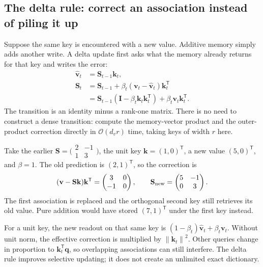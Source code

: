 \documentclass[11pt, oneside]{book}
\newcommand{\norm}[1]{\left\lVert #1 \right\rVert}
\newcommand{\T}{^{\mathsf{T}}}           %
\newcommand{\bigO}[1]{\mathcal{O}\!\left(#1\right)}
\let\originalsubsection\subsection
\renewcommand{\subsection}{\Needspace{6\baselineskip}\originalsubsection}
\begin{document}
\subsection*{The delta rule: correct an association instead of piling it up}
Suppose the same key is encountered with a new value. Additive memory simply adds another write. A delta update first asks what the memory already returns for that key and writes the error:
\begin{align*}
 \widehat{\mathbf{v}}_t&=\mathbf{S}_{t-1}\mathbf{k}_t,\\
 \mathbf{S}_t&=\mathbf{S}_{t-1}
  +\beta_t(\mathbf{v}_t-\widehat{\mathbf{v}}_t)\mathbf{k}_t\T\\
 &=\mathbf{S}_{t-1}(\mathbf{I}-\beta_t\mathbf{k}_t\mathbf{k}_t\T)
  +\beta_t\mathbf{v}_t\mathbf{k}_t\T.
\end{align*}
The transition is an identity minus a rank-one matrix. There is no need to construct a dense transition: compute the memory-vector product and the outer-product correction directly in $\bigO{d_vr}$ time, taking keys of width $r$ here.

\begin{exbox}[title={Changing one stored value}]
Take the earlier $\mathbf{S}=\bigl(\begin{smallmatrix}2&-1\\1&3\end{smallmatrix}\bigr)$, the unit key $\mathbf{k}=(1,0)\T$, a new value $(5,0)\T$, and $\beta=1$. The old prediction is $(2,1)\T$, so the correction is
\[
 (\mathbf{v}-\mathbf{S}\mathbf{k})\mathbf{k}\T
 =\begin{pmatrix}3&0\\-1&0\end{pmatrix},\qquad
 \mathbf{S}_{\rm new}=\begin{pmatrix}5&-1\\0&3\end{pmatrix}.
\]
The first association is replaced and the orthogonal second key still retrieves its old value. Pure addition would have stored $(7,1)\T$ under the first key instead.
\end{exbox}

For a unit key, the new readout on that same key is $(1-\beta_t)\widehat{\mathbf{v}}_t+\beta_t\mathbf{v}_t$. Without unit norm, the effective correction is multiplied by $\norm{\mathbf{k}_t}^2$. Other queries change in proportion to $\mathbf{k}_t\T\mathbf{q}$, so overlapping associations can still interfere. The delta rule improves selective updating; it does not create an unlimited exact dictionary.
\end{document}
